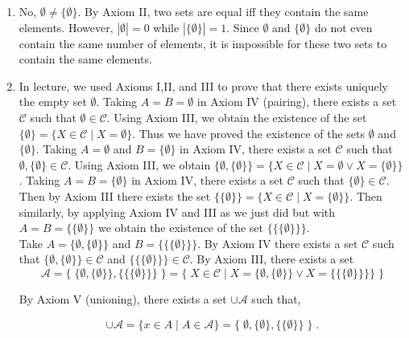 \documentclass[a4paper]{article}
\begin{document}
\begin{enumerate}
\item

No, $\emptyset \neq \{\emptyset\}$. By Axiom II, two sets are equal iff they contain the same elements. However, $|\emptyset| = 0$ while $|\{\emptyset \}| = 1$. Since $\emptyset$ and $\{\emptyset \}$ do not even contain the same number of elements, it is impossible for these two sets to contain the same elements. 
\item

In lecture, we used Axioms I,II, and III to prove that there exists uniquely the empty set $\emptyset$. Taking $A = B = \emptyset$ in Axiom IV (pairing), there exists a set $\mathcal{C}$ such that $\emptyset \in \mathcal{C}$. Using Axiom III, we obtain the existence of the set $\{\emptyset \} = \{X \in \mathcal{C} \mid X = \emptyset \}$. Thus we have proved the existence of the sets $\emptyset$ and $\{\emptyset \}$. Taking $A = \emptyset$ and $B = \{ \emptyset \}$ in Axiom IV, there exists a set $\mathcal{C}$ such that $\emptyset, \{\emptyset \} \in \mathcal{C}$. Using Axiom III, we obtain $\{\emptyset, \{\emptyset \} \} = \{X \in \mathcal{C} \mid X = \emptyset \lor X = \{\emptyset \} \}$. Taking $A = B = \{\emptyset \}$ in Axiom IV, there exists a set $\mathcal{C}$ such that $\{\emptyset \} \in \mathcal{C}$. Then by Axiom III there exists the set $\{\{\emptyset \} \} = \{ X \in \mathcal{C} \mid X = \{\emptyset \} \}$. Then similarly, by applying Axiom IV and III  as we just did but with $A = B = \{ \{\emptyset \} \}$ we obtain the existence of the set $\{\{\{\emptyset \} \} \}$. \\

Take $A = \{\emptyset , \{\emptyset\} \}$ and $B = \{\{\{\emptyset \}\}\}$. By Axiom IV there exists a set $\mathcal{C}$ such that $\{\emptyset, \{\emptyset\} \} \in \mathcal{C}$ and $\{\{\{\emptyset \}\}\} \in \mathcal{C}$. By Axiom III, there exists a set
$$
\mathcal{A} = \{\; \{\emptyset, \{\emptyset\} \}, \{\{\{\emptyset\}\}\} \; \} = \{ \; X \in \mathcal{C} \mid X = \{\emptyset, \{\emptyset\} \} \lor X = \{\{\{\emptyset\}\}\} \} \; \}
$$

By Axiom V (unioning), there exists a set $\cup \mathcal{A}$ such that,

$$
\cup \mathcal{A}
= \{x \in A \mid A \in \mathcal{A} \}
= \{\;\emptyset, \{\emptyset \}, \{\{\emptyset \}\} \;\} \;.
$$



	
\end{enumerate}
\end{document}
